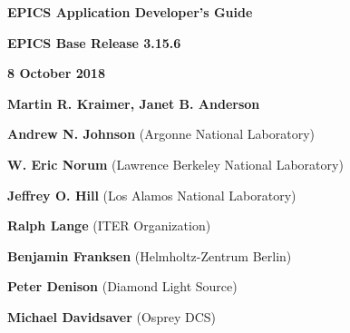 \def\divider{\par
  \vskip 0.5in
  \hrulefill
  \vskip 0.5in
}

\divider

\Huge \textbf{EPICS Application Developer's Guide}

\vskip 0.5in

\Large \textbf{EPICS Base Release 3.15.6}

\textbf{8 October 2018}

\vskip 0.5in

\normalsize
\textbf{Martin R. Kraimer, Janet B. Anderson}

\textbf{Andrew N. Johnson} (Argonne National Laboratory)

\textbf{W. Eric Norum} (Lawrence Berkeley National Laboratory)

\textbf{Jeffrey O. Hill} (Los Alamos National Laboratory)

\textbf{Ralph Lange} (ITER Organization)

\textbf{Benjamin Franksen} (Helmholtz-Zentrum Berlin)

\textbf{Peter Denison} (Diamond Light Source)

\textbf{Michael Davidsaver} (Osprey DCS)

\divider
